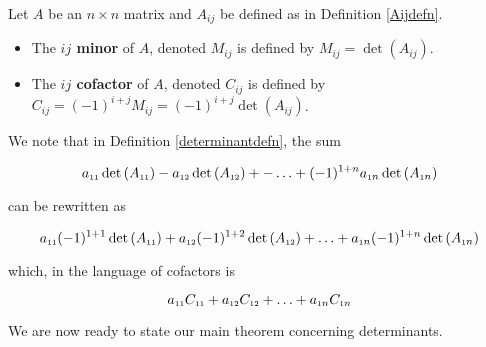 \documentclass{ximera}
\begin{document}
\smallskip

\colorbox{ResultColor}{\bbm

\begin{defn}  \label{minorcofactordefn} Let $A$ be an $n \times n$ matrix and $A_{ij}$ be defined as in Definition \ref{Aijdefn}.  

\begin{itemize}

\item The   \textbf{\boldmath $ij$ minor} of $A$, denoted $M_{ij}$ is defined by $M_{ij} = \det\left(A_{ij}\right)$. 

\item The \textbf{\boldmath $ij$ cofactor} of $A$, denoted $C_{ij}$ is defined by $C_{ij} = (-1)^{i+j}M_{ij} = (-1)^{i+j}\det\left(A_{ij}\right)$. 

\end{itemize}

\end{defn}

\ebm}

\smallskip

We note that in Definition \ref{determinantdefn}, the sum 

\[a_{\mbox{\tiny$11$}} \det\left(A_{\mbox{\tiny$11$}}\right)- a_{\mbox{\tiny$12$}} \det\left(A_{\mbox{\tiny$12$}}\right) + -  \ldots  + (-1)^{1+n} a_{\mbox{\tiny$1$}n} \det\left(A_{\mbox{\tiny$1$}n}\right)\]

can be rewritten as

\[a_{\mbox{\tiny$11$}} (-1)^{1+1} \det\left(A_{\mbox{\tiny$11$}}\right) + a_{\mbox{\tiny$12$}} (-1)^{1+2} \det\left(A_{\mbox{\tiny$12$}}\right) + \ldots  + a_{\mbox{\tiny$1$}n} (-1)^{1+n} \det\left(A_{\mbox{\tiny$1$}n}\right)\]

which, in the language of cofactors is

\[a_{\mbox{\tiny$11$}} C_{\mbox{\tiny$11$}} + a_{\mbox{\tiny$12$}}C_{\mbox{\tiny$12$}} + \ldots  + a_{\mbox{\tiny$1$}n}C_{\mbox{\tiny$1$}n} \]

We are now ready to state our main theorem concerning determinants.

\smallskip
\end{document}
